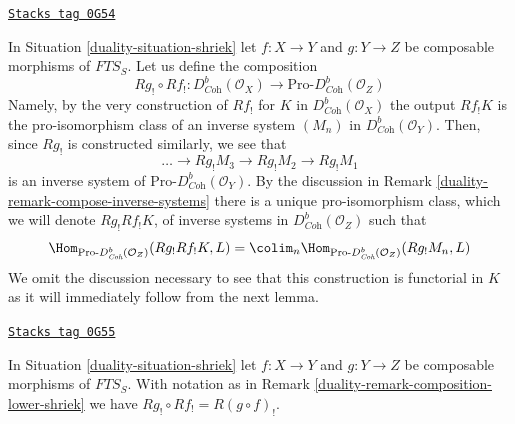 \begin{remark}
\label{duality-remark-composition-lower-shriek}
\href{https://stacks.math.columbia.edu/tag/0G54}{\texttt{Stacks tag 0G54}}

In Situation \ref{duality-situation-shriek} let $f : X \to Y$ and $g : Y \to Z$
be composable morphisms of $\textit{FTS}_S$. Let us define the composition
$$
Rg_! \circ Rf_! :
D^b_{\textit{Coh}}(\mathcal{O}_X)
\longrightarrow
\text{Pro-}D^b_{\textit{Coh}}(\mathcal{O}_Z)
$$
Namely, by the very construction of $Rf_!$
for $K$ in $D^b_{\textit{Coh}}(\mathcal{O}_X)$
the output $Rf_!K$ is the pro-isomorphism class
of an inverse system $(M_n)$ in $D^b_{\textit{Coh}}(\mathcal{O}_Y)$.
Then, since $Rg_!$ is constructed similarly, we see that
$$
\ldots \to Rg_!M_3 \to Rg_!M_2 \to Rg_!M_1
$$
is an inverse system of $\text{Pro-}D^b_{\textit{Coh}}(\mathcal{O}_Y)$.
By the discussion in Remark \ref{duality-remark-compose-inverse-systems}
there is a unique pro-isomorphism class, which we will denote
$Rg_! Rf_! K$, of inverse systems in $D^b_{\textit{Coh}}(\mathcal{O}_Z)$
such that
$$
\Hom_{\text{Pro-}D^b_{\textit{Coh}}(\mathcal{O}_Z)}(Rg_!Rf_!K, L) =
\colim_n \Hom_{\text{Pro-}D^b_{\textit{Coh}}(\mathcal{O}_Z)}(Rg_!M_n, L)
$$
We omit the discussion necessary to see that this construction
is functorial in $K$ as it will immediately follow from the next lemma.
\end{remark}

\begin{lemma}
\label{duality-lemma-composition-lower-shriek}
\href{https://stacks.math.columbia.edu/tag/0G55}{\texttt{Stacks tag 0G55}}

In Situation \ref{duality-situation-shriek} let $f : X \to Y$ and $g : Y \to Z$
be composable morphisms of $\textit{FTS}_S$. With notation as in
Remark \ref{duality-remark-composition-lower-shriek} we have
$Rg_! \circ Rf_! = R(g \circ f)_!$.
\end{lemma}

